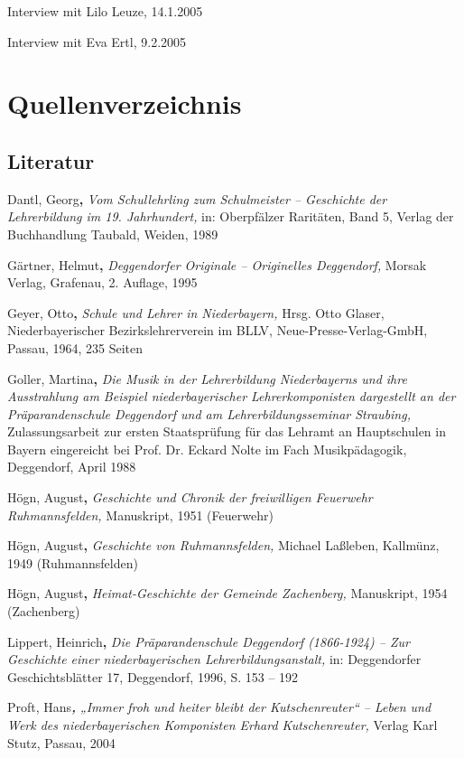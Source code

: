 \documentclass{book}
\begin{document}
Interview mit Lilo Leuze, 14.1.2005

Interview mit Eva Ertl, 9.2.2005

\section{Quellenverzeichnis}

\subsection{Literatur}

Dantl, Georg\textbf{,} \textit{Vom Schullehrling zum Schulmeister –
Geschichte der Lehrerbildung im 19. Jahrhundert,} in: Oberpfälzer
Raritäten, Band 5, Verlag der Buchhandlung Taubald, Weiden, 1989

Gärtner, Helmut\textbf{,} \textit{Deggendorfer Originale – Originelles
Deggendorf,} Morsak Verlag, Grafenau, 2. Auflage, 1995

Geyer, Otto\textbf{,} \textit{Schule und Lehrer in Niederbayern,} Hrsg.
Otto Glaser, Niederbaye\-rischer Bezirkslehrerverein im BLLV,
Neue-Presse-Verlag-GmbH, Passau, 1964, 235 Seiten

Goller, Martina\textbf{,} \textit{Die Musik in der Lehrerbildung
Niederbayerns und ihre Ausstrah\-lung am Beispiel niederbayerischer
Lehrerkomponisten dargestellt an der Präparanden\-schule Deggendorf und
am Lehrerbildungsseminar Straubing,} Zulassungsarbeit zur ersten
Staatsprüfung für das Lehramt an Hauptschulen in Bayern einge\-reicht
bei Prof. Dr. Eckard Nolte im Fach Musikpädagogik, Deggendorf, April
1988

Högn, August\textbf{,} \textit{Geschichte und Chronik der freiwilligen
Feuerwehr Ruhmannsfelden,} Manuskript, 1951 (Feuerwehr)

Högn, August\textbf{,} \textit{Geschichte von Ruhmannsfelden,} Michael
Laßleben, Kallmünz, 1949 (Ruhmannsfelden)

Högn, August\textbf{,} \textit{Heimat-Geschichte der Gemeinde
Zachenberg,} Manuskript, 1954 (Zachenberg)

Lippert, Heinrich\textbf{,} \textit{Die Präparandenschule Deggendorf
(1866-1924) – Zur Geschichte einer niederbayerischen
Lehrerbildungsanstalt,} in: Deggendorfer Geschichtsblät\-ter 17,
Deggendorf, 1996, S. 153 – 192

Proft, Hans\textbf{\textit{,}}\textit{ „Immer froh und heiter bleibt der
Kutschenreuter“ – Leben und Werk des niederbayerischen Komponisten
Erhard Kutschenreuter,} Verlag Karl Stutz, Passau, 2004
\end{document}
